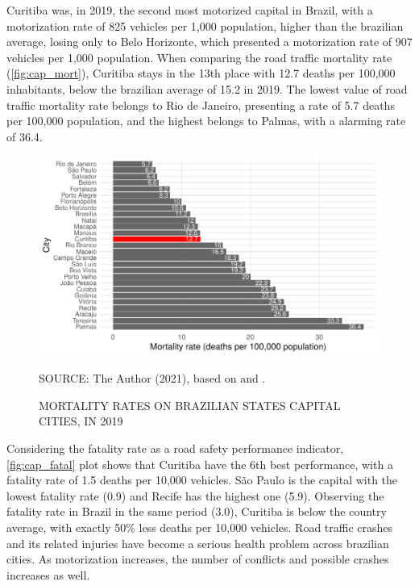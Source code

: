 Curitiba was, in 2019, the second most motorized capital in Brazil, with a motorization rate of 825 vehicles per 1,000 population, higher than the brazilian average, losing only to Belo Horizonte, which presented a motorization rate of 907 vehicles per 1,000 population. When comparing the road traffic mortality rate (\autoref{fig:cap_mort}), Curitiba stays in the 13th place with 12.7 deaths per 100,000 inhabitants, below the brazilian average of 15.2 in 2019. The lowest value of road traffic mortality rate belongs to Rio de Janeiro, presenting a rate of 5.7 deaths per 100,000 population, and the highest belongs to Palmas, with a alarming rate of 36.4. 

\begin{figure}[!htbp]
    \centering\footnotesize
    \captionsetup{font=footnotesize}
    \caption{MORTALITY RATES ON BRAZILIAN STATES CAPITAL CITIES, IN 2019}
    \includegraphics{fig/cap_mort.pdf}
    \label{fig:cap_mort}
    \par SOURCE: The Author (2021), based on \textcite{MinistryofHealth2020} and \textcite{MinistryofHealth2021}.
\end{figure}  

Considering the fatality rate as a road safety performance indicator, \autoref{fig:cap_fatal} plot shows that Curitiba have the 6th best performance, with a fatality rate of 1.5 deaths per 10,000 vehicles. São Paulo is the capital with the lowest fatality rate (0.9) and Recife has the highest one (5.9). Observing the fatality rate in Brazil in the same period (3.0), Curitiba is below the country average, with exactly 50\% less deaths per 10,000 vehicles. Road traffic crashes and its related injuries have become a serious health problem across brazilian cities. As motorization increases, the number of conflicts and possible crashes increases as well.

